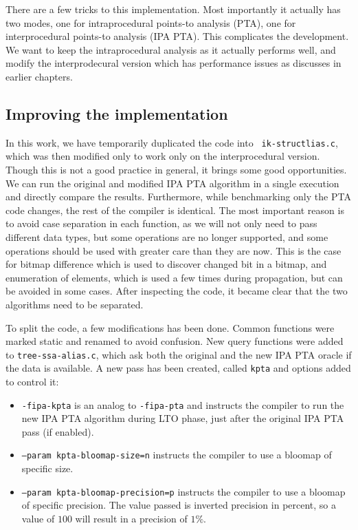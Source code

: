 There are a few tricks to this implementation. Most importantly it actually has
two modes, one for intraprocedural points-to analysis (PTA), one for
interprocedural points-to analysis (IPA PTA). This complicates the development.
We want to keep the intraprocedural analysis as it actually performs well, and
modify the interprodecural version which has performance issues as discusses in
earlier chapters.

\subsection{Improving the implementation}

In this work, we have temporarily duplicated the code into {\tt
ik-structlias.c}, which was then modified only to work only on the interprocedural
version. Though this is not a good practice in general, it brings some good
opportunities.  We can run the original and modified IPA PTA algorithm in a
single execution and directly compare the results. Furthermore, while
benchmarking only the PTA code changes, the rest of the compiler is identical.
The most important reason is to avoid case separation in each function, as we
will not only need to pass different data types, but some operations are no
longer supported, and some operations should be used with greater care than
they are now. This is the case for bitmap difference which is used to discover
changed bit in a bitmap, and enumeration of elements, which is used a few times
during propagation, but can be avoided in some cases. After inspecting the
code, it became clear that the two algorithms need to be separated.

To split the code, a few modifications has been done. Common functions were
marked static and renamed to avoid confusion. New query functions were added to
{\tt tree-ssa-alias.c}, which ask both the original and the new IPA PTA oracle
if the data is available. A new pass has been created, called {\tt kpta} and options added to control it:

\begin{itemize}
	\item {\tt -fipa-kpta} is an analog to {\tt -fipa-pta} and instructs the compiler to run the new IPA PTA algorithm during LTO phase, just after the original IPA PTA pass (if enabled).
	\item {\tt --param kpta-bloomap-size=n} instructs the compiler to use a bloomap of specific size.
	\item {\tt --param kpta-bloomap-precision=p} instructs the compiler to use a bloomap of specific precision. The value passed is inverted precision in percent, so a value of $100$ will result in a precision of $1\%$.
\end{itemize}


